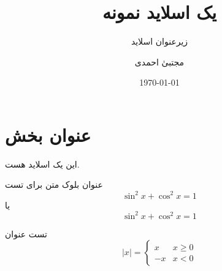 \documentclass{beamer}
\title{یک اسلاید نمونه}
\subtitle{زیرعنوان اسلاید}
\author{مجتبیٰ احمدی}
\institute[پیام‌نو‌ر مشگین شهر]{دانشگاه: پیام‌نو‌ر مشگین شهر}
\date{\today}
\begin{document}
\begin{frame}
\titlepage
\end{frame}
\section{عنوان بخش}
\begin{frame}
این یک اسلاید هست.
\begin{block}{عنوان بلوک}
متن برای تست
\[
\sin^2 x+\cos^2 x=1 
\]
یا 
\begin{equation}
\sin^2 x+\cos^2 x=1 
\end{equation}
\end{block}
\begin{alertblock}{تست عنوان}
\begin{equation*}
|x|=
\begin{cases}
x & x\geq 0\\
-x & x<0
\end{cases}
\end{equation*}
\end{alertblock}

\end{frame}
\end{document}
